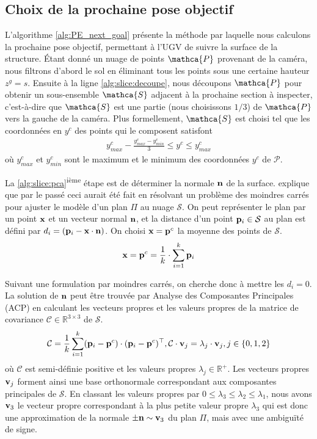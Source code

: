 \subsection{Choix de la prochaine pose objectif}

L'algorithme \ref{alg:PE_next_goal} présente la méthode par laquelle nous calculons la prochaine pose objectif, permettant à l'UGV de suivre la surface de la structure. Étant donné un nuage de points $\mathca{P}$ provenant de la caméra, nous filtrons d'abord le sol en éliminant tous les points sous une certaine hauteur $z^g = s$. Ensuite à la ligne \ref{alg:slice:decoupe}, nous découpons $\mathca{P}$ pour obtenir un sous-ensemble $\mathca{S}$ adjacent à la prochaine section à inspecter, c'est-à-dire que $\mathca{S}$ est une partie (nous choisissons $1/3$) de $\mathca{P}$ vers la gauche de la caméra. Plus formellement, $\mathca{S}$ est choisi tel que les coordonnées en $y^c$ des points qui le composent satisfont
\begin{align}
  y^c_{max} - \frac{y^c_{max} - y^c_{min}}{3} \leq y^c \leq y^c_{max}
\end{align}
où $y^c_{max}$ et $y^c_{min}$ sont le maximum et le minimum des coordonnées $y^c$ de $\mathcal{P}$.

La \ref{alg:slice:pca}\textsuperscript{ième} étape est de déterminer la normale $\mathbf{n}$ de la surface. \citep{Rusu2009} explique que par le passé ceci aurait été fait en résolvant un problème des moindres carrés pour ajuster le modèle d'un plan $\Pi$ au nuage $\mathcal{S}$. On peut représenter le plan par un point $\mathbf{x}$ et un vecteur normal $\mathbf{n}$, et la distance d'un point $\mathbf{p}_i \in \mathcal{S}$ au plan est défini par $d_i = (\mathbf{p}_i - \mathbf{x} \cdot \mathbf{n})$. On choisi $\mathbf{x} = \mathbf{p}^c$ la moyenne des points de $\mathcal{S}$.
\begin{align}
  \mathbf{x} = \mathbf{p}^c = \frac{1}{k} \cdot \sum^{k}_{i=1} \mathbf{p}_i
\end{align}

Suivant une formulation par moindres carrés, on cherche donc à mettre les $d_i = 0$. La solution de $\mathbf{n}$ peut être trouvée par Analyse des Composantes Principales (ACP) en calculant les vecteurs propres et les valeurs propres de la matrice de covariance $\mathcal{C} \in \mathbb{R}^{3\times 3}$ de $\mathcal{S}$.
\begin{align}
  \mathcal{C} = \frac{1}{k} \sum^{k}_{i=1} (\mathbf{p}_i - \mathbf{p}^c) \cdot (\mathbf{p}_i - \mathbf{p}^c)^\top, \mathcal{C} \cdot \mathbf{v}_j = \lambda_j \cdot \mathbf{v}_j, j \in \{0, 1, 2\}
\end{align}
où $\mathcal{C}$ est semi-définie positive et les valeurs propres $\lambda_j \in \mathbb{R}^+$. Les vecteurs propres $\mathbf{v}_j$ forment ainsi une base orthonormale correspondant aux composantes principales de $\mathcal{S}$. En classant les valeurs propres par $0 \leq \lambda_3 \leq \lambda_2 \leq \lambda_1$, nous avons $\mathbf{v}_3$ le vecteur propre correspondant à la plus petite valeur propre $\lambda_3$ qui est donc une approximation de la normale $\pm \mathbf{n} \sim \mathbf{v}_{3}$ du plan $\Pi$, mais avec une ambiguïté de signe.

